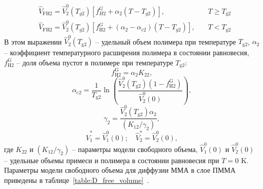 \begin{equation}
	\begin{aligned}
		&\hat{V}_\mathrm{FH2} =
		\hat{V}_2^0 (T_{g2}) \left[ f_{H2}^{G}+\alpha_2 (T-T_{g2}) \right], & T \geq T_\mathrm{g2} \\
		&\hat{V}_\mathrm{FH2} =
		\hat{V}_2^0 (T_{g2})\left[f_\mathrm{H2}^{G}+(\alpha_2-\alpha_{c2})(T-T_{g2})\right], \hspace{1em} & T<T_\mathrm{g2}
	\end{aligned}
\end{equation}
В этом выражении $\hat{V}_2^0\left(T_{\mathrm{g} 2}\right)$ -- удельный объем полимера при температуре $T_\mathrm{g2}$, \linebreak $\alpha_2$ -- коэффициент температурного расширения полимера в состоянии равновесия, $f_{\mathrm{H} 2}^{\mathrm{G}}$ -- доля объема пустот в полимере при температуре $T_\mathrm{g2}$:
\begin{equation}
	f_{\mathrm{H} 2}^{\mathrm{G}}=\alpha_2 K_{22},
\end{equation}
\begin{equation}
	\alpha_{\mathrm{c} 2}=\frac{1}{T_{\mathrm{g} 2}} \ln \left(\frac{\hat{V}_2^0\left(T_{\mathrm{g} 2}\right)\left(1-f_{\mathrm{H} 2}^{\mathrm{G}}\right)}{\hat{V}_2^0(0)}\right),
\end{equation}
\begin{equation}
	\gamma_2=\frac{\hat{V}_2^0\left(T_{\mathrm{g} 2}\right) \alpha_2}{\left(K_{12} / \gamma_2\right)},
\end{equation}
\begin{equation}
	\hat{V}_1^*=\hat{V}_1^0(0); \hspace{1em} \hat{V}_2^*=\hat{V}_2^0(0),
\end{equation}
где $K_{22}$ и $\left(K_{12} / \gamma_2\right)$ -- параметры модели свободного объема, $\hat{V}_1^0(0)$ и $\hat{V}_2^0(0)$ -- удельные объемы примеси и полимера в состоянии равновесия при $T=0$ K. Параметры модели свободного объема для диффузии ММА в слое ПММА приведены в таблице~\ref{table:D_free_volume}~\cite{Tonge_free_volume_parameters}.

